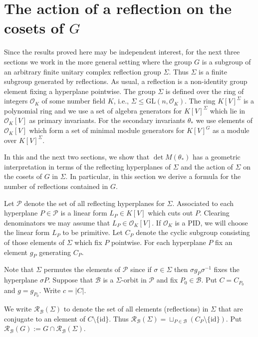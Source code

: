 \documentclass[12pt]{amsart}
\renewcommand{\leq}{\leqslant}
\def\GL{\text{GL}}
\newcommand{\KK}{K}
\newcommand{\OK}{{{\mathcal O}_K}}
\theoremstyle{definition}
\newcommand{\id}{{\mathrm{id}}}
\newcommand{\calb}{\mathcal{B}}
\newcommand{\calp}{\mathcal{P}}
\newcommand{\calr}{\mathcal{R}}
\begin{document}
 

\section{The action of a reflection on the cosets of $G$}\label{reflections}

Since the results proved here may be independent interest, for the next three sections 
we work in the more general setting where the group $G$ is a subgroup of an arbitrary finite unitary complex reflection group $\Sigma$.
Thus $\Sigma$ is a finite subgroup generated by reflections.  As usual, a reflection is a non-identity group element fixing a hyperplane pointwise.  The group $\Sigma$ is defined over the ring of integers $\OK$ of some number field $\KK$, i.e., 
$\Sigma \leq \GL(n,\OK)$.  
The ring $K[V]^\Sigma$ is a polynomial ring and we
use a set of algebra generators for $K[V]^\Sigma$ 
which lie in $\OK[V]$ as primary invariants.  For 
the secondary invariants $\theta_*$ 
we use elements of $\OK[V]$ which form a set of minimal module generators
for $K[V]^G$ as a module over $K[V]^\Sigma$.



In this and the next two sections, we show that 
$\det{M}(\theta_*)$ has a geometric interpretation in terms of the 
reflecting hyperplanes of $\Sigma$ and the action of $\Sigma$ on the cosets 
of $G$ in $\Sigma$.  In particular, in this section we derive a formula for 
the number of reflections contained in $G$.  

Let $\calp$ denote the set of all reflecting hyperplanes for $\Sigma$.  
Associated to each hyperplane $P \in \calp$ is a linear form $L_P\in\KK[V]$ which cuts out $P$.  Clearing denominators we may assume that $L_P 
\in \OK[V]$.  If $\OK$ is a PID, we will choose the linear form
 $L_P$ to be primitive.
Let $C_P$ denote the cyclic subgroup consisting of those elements of $\Sigma$ which fix $P$ pointwise.  For each hyperplane $P$ fix an element $g_P$ generating $C_P$.

Note that $\Sigma$ permutes the elements of $\calp$ since if $\sigma \in \Sigma$
then $\sigma g_P \sigma^{-1}$ fixes the hyperplane $\sigma P$.   
Suppose that $\calb$ is a $\Sigma$-orbit in $\calp$ and fix $P_0 \in \calb$. 
Put $C = C_{P_0}$ and $g=g_{P_0}$.   Write $c = |C|$.

We write $\calr_\calb(\Sigma)$ to denote the set of all elements (reflections) in $\Sigma$ that are conjugate to an element of $C \setminus \{\id\}$.  
Thus $\calr_\calb(\Sigma) = \sqcup_{P \in \calb} (C_P \setminus \{\id\})$. 
Put $\calr_\calb(G) := G \cap \calr_\calb(\Sigma)$.
\end{document}
